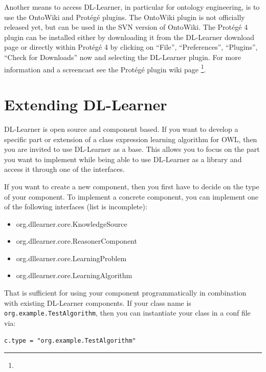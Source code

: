 \documentclass[a4paper,12pt]{scrartcl}
\begin{document}
Another means to access DL-Learner, in particular for ontology engineering, is to use the OntoWiki and Protégé plugins. The OntoWiki plugin is not officially released yet, but can be used in the SVN version of OntoWiki. The Protégé 4 plugin can be installed either by downloading it from the DL-Learner download page or directly within Protégé 4 by clicking on ``File'', ``Preferences'', ``Plugins'', ``Check for Downloads'' now and selecting the DL-Learner plugin. For more information and a screencast see the Protégé plugin wiki page \footnote{\wikiprotplugin}.

\section{Extending DL-Learner}
\label{sec:developing}

DL-Learner is open source and component based. If you want to develop a specific part or extension of a class expression learning algorithm for OWL, then you are invited to use DL-Learner as a base. This allows you to focus on the part you want to implement while being able to use DL-Learner as a library and access it through one of the interfaces. 

If you want to create a new component, then you first have to decide on the type of your component. To implement a concrete component, you can implement one of the following interfaces (list is incomplete):

\begin{itemize}
 \item org.dllearner.core.KnowledgeSource
 \item org.dllearner.core.ReasonerComponent
 \item org.dllearner.core.LearningProblem
 \item org.dllearner.core.LearningAlgorithm
\end{itemize}

That is sufficient for using your component programmatically in combination with existing DL-Learner components.
If your class name is \verb|org.example.TestAlgorithm|, then you can instantiate your class in a conf file via:
\begin{verbatim}
c.type = "org.example.TestAlgorithm"
\end{verbatim}
\end{document}
